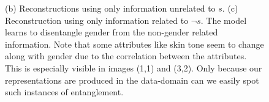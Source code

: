 \begin{figure}[tb]
{    (b) Reconstructions using only information unrelated to $s$.
    (c) Reconstruction using only information related to $\neg s$.
    The model learns to disentangle gender from the non-gender related information.
    Note that some attributes like skin tone seem to change along with gender due to the correlation between the attributes.
    This is especially visible in images (1,1) and (3,2). Only because our representations are produced in the data-domain can we easily spot such instances of entanglement.
  }%
  \label{fig:celeba_cflow}
\end{figure}
